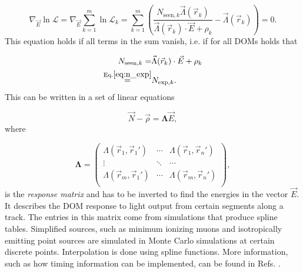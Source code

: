 \begin{equation}
\nabla_{\vec{E}} \ln \mathcal{L} = \nabla_{\vec{E}} \sum^m_{k=1} \ln \mathcal{L}_k = \sum^m_{k=1} \left(\frac{N_{\textrm{seen},k} \vec{\Lambda}(\vec{r}_k)}{\vec{\Lambda}(\vec{r}_k) \cdot \vec{E} + \rho_k} - \vec{\Lambda}(\vec{r}_k) \right) = 0.
\end{equation}
\noindent This equation holds if all terms in the sum vanish, i.e. if for all DOMs holds that

\begin{equation}
\begin{split}
N_{\textrm{seen},k} = &\vec{\Lambda}(\vec{r}_k) \cdot \vec{E} + \rho_k\\
\overset{\textrm{Eq.}\ref{eq:n_exp}}{=} &N_{\textrm{exp},k}
.
\end{split}
\end{equation}
\noindent This can be written in a set of linear equations

\begin{equation}
\vec{N} - \vec{\rho} = \mathbf{\Lambda} \vec{E}, 
\end{equation}
\noindent where

\begin{equation}
\mathbf{\Lambda} = 
\begin{pmatrix}
\Lambda(\vec{r}_1,\vec{r}_1') & \cdots & \Lambda(\vec{r}_1,\vec{r}_n')\\
\vdots  & \ddots & \cdots \\
\Lambda(\vec{r}_m,\vec{r}_1') & \cdots & \Lambda(\vec{r}_m,\vec{r}_n')\\
\end{pmatrix},
\end{equation}
\noindent is the \textit{response matrix} and has to be inverted to find the energies in the vector $\vec{E}$. It describes the DOM response to light output from certain segments along a track. The entries in this matrix come from simulations that produce spline tables. Simplified sources, such as minimum ionizing muons and isotropically emitting point sources are simulated in Monte Carlo simulations at certain discrete points. Interpolation is done using spline functions. More information, such as how timing information can be implemented, can be found in Refs. \cite{millipedeinternal,stefthesis}.


